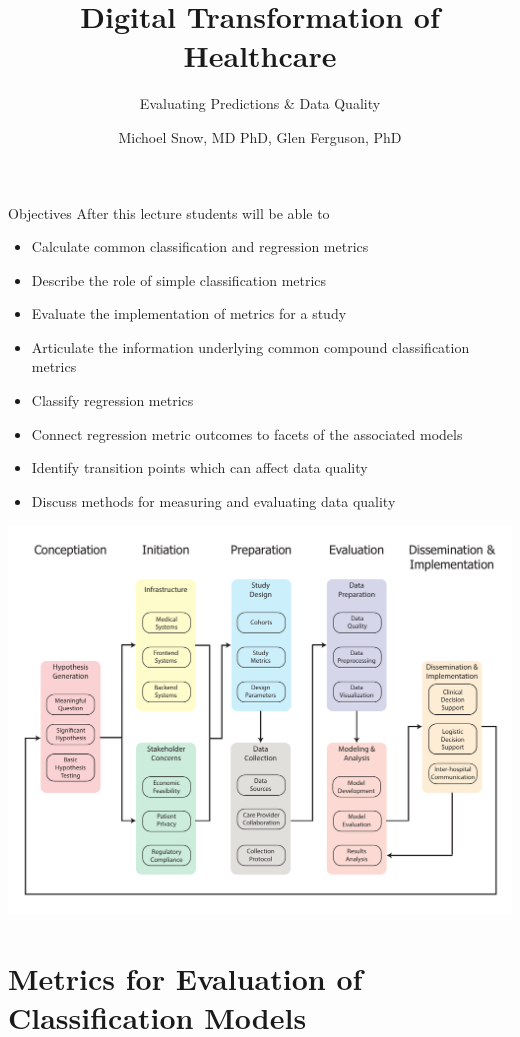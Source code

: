 \documentclass[10pt, xcolor=table]{beamer}
\title{Digital Transformation of Healthcare}
\subtitle{Evaluating Predictions \& Data Quality}
\date{}
\author{Michoel Snow, MD PhD, Glen Ferguson, PhD}
\institute{Center for Health Data Innovations}
\begin{document}
\maketitle


\begin{frame}{Objectives}
	After this lecture students will be able to 
	\begin{itemize}
		\item Calculate common classification and regression metrics
		\item Describe the role of simple classification metrics
		\item Evaluate the implementation of metrics for a study 
		\item Articulate the information underlying common compound classification metrics 
		\item Classify regression metrics 
		\item Connect regression metric outcomes to facets of the associated models
		\item Identify transition points which can affect data quality
		\item Discuss methods for measuring and evaluating data quality 
	\end{itemize}%
\end{frame}


\begin{frame}
	\includegraphics[height=\textheight]{../../informatics_pipeline.pdf}
\end{frame}

\section{Metrics for Evaluation of Classification Models}
\end{document}
